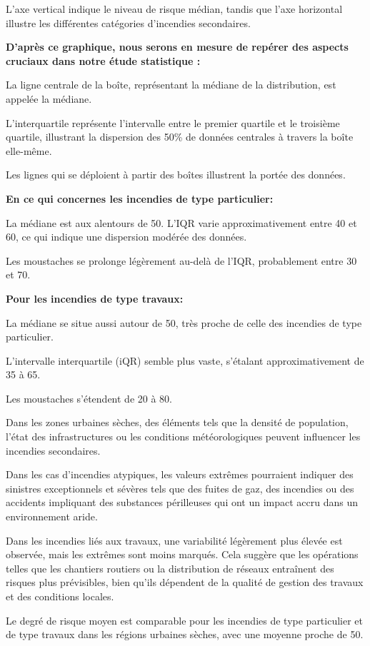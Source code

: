 \documentclass[
]{article}
\begin{document}
L'axe vertical indique le niveau de risque médian, tandis que l'axe
horizontal illustre les différentes catégories d'incendies secondaires.

\textbf{D'après ce graphique, nous serons en mesure de repérer des
aspects cruciaux dans notre étude statistique : }

La ligne centrale de la boîte, représentant la médiane de la
distribution, est appelée la médiane.

L'interquartile représente l'intervalle entre le premier quartile et le
troisième quartile, illustrant la dispersion des 50\% de données
centrales à travers la boîte elle-même.

Les lignes qui se déploient à partir des boîtes illustrent la portée des
données.

\textbf{En ce qui concernes les incendies de type particulier:}

La médiane est aux alentours de 50. L'IQR varie approximativement entre
40 et 60, ce qui indique une dispersion modérée des données.

Les moustaches se prolonge légèrement au-delà de l'IQR, probablement
entre 30 et 70.

\textbf{Pour les incendies de type travaux: }

La médiane se situe aussi autour de 50, très proche de celle des
incendies de type particulier.

L'intervalle interquartile (iQR) semble plus vaste, s'étalant
approximativement de 35 à 65.

Les moustaches s'étendent de 20 à 80.

Dans les zones urbaines sèches, des éléments tels que la densité de
population, l'état des infrastructures ou les conditions météorologiques
peuvent influencer les incendies secondaires.

Dans les cas d'incendies atypiques, les valeurs extrêmes pourraient
indiquer des sinistres exceptionnels et sévères tels que des fuites de
gaz, des incendies ou des accidents impliquant des substances
périlleuses qui ont un impact accru dans un environnement aride.

Dans les incendies liés aux travaux, une variabilité légèrement plus
élevée est observée, mais les extrêmes sont moins marqués. Cela suggère
que les opérations telles que les chantiers routiers ou la distribution
de réseaux entraînent des risques plus prévisibles, bien qu'ils
dépendent de la qualité de gestion des travaux et des conditions
locales.

Le degré de risque moyen est comparable pour les incendies de type
particulier et de type travaux dans les régions urbaines sèches, avec
une moyenne proche de 50.
\end{document}
